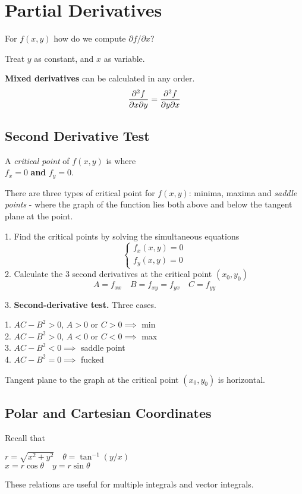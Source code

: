 \section{Partial Derivatives}

For $f(x,y)$ how do we compute $\partial f / \partial x$?

Treat $y$ as constant, and $x$ as variable.

\textbf{Mixed derivatives} can be calculated in any order.
\begin{equation*}
    \pdv{f}{x}{y} = \pdv{f}{y}{x}
\end{equation*}

\subsection*{Second Derivative Test}

A \textit{critical point} of $f(x,y)$ is where \\
$f_x = 0$ \textbf{and} $f_y = 0$.

There are three types of critical point for $f(x,y)$: minima, maxima and \textit{saddle points} - where the graph
of the function lies both above and below the tangent plane at the point.
\vspace{\baselineskip}

1. Find the critical points by solving the simultaneous equations
\begin{equation*}
\begin{cases}
    f_x(x,y) = 0 \\
    f_y(x,y) = 0
\end{cases}
\end{equation*}
2. Calculate the 3 second derivatives at the critical point $(x_0, y_0)$
\begin{equation*}
    A = f_{xx} \quad B = f_{xy} = f_{yx} \quad C = f_{yy}
\end{equation*}

3. \textbf{Second-derivative test.} Three cases.

1. $AC - B^2 > 0$, $A > 0$ or $C > 0 \implies$ min \\
2. $AC - B^2 > 0$, $A < 0$ or $C < 0 \implies$ max \\
3. $AC - B^2 < 0 \implies$ saddle point \\
4. $AC - B^2 = 0 \implies$ fucked

Tangent plane to the graph at the critical point $(x_0, y_0)$ is horizontal.

\subsection*{Polar and Cartesian Coordinates}
Recall that
\vspace{\baselineskip}

$r = \sqrt{x^2 + y^2} \quad \theta = \tan^{-1} (y/x)$ \\
$x = r \cos \theta \quad y = r \sin \theta$ 
\vspace{\baselineskip}

These relations are useful for multiple integrals and vector integrals.